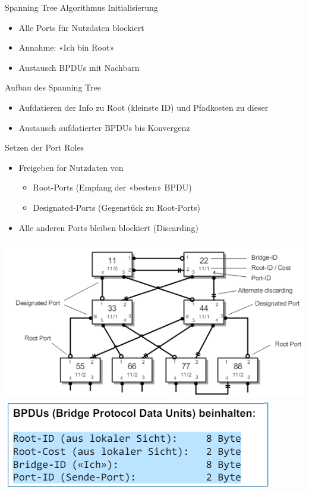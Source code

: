 \begin{KR}{Spanning Tree Algorithmus}
    Initialisierung
    \begin{itemize}
        \item Alle Ports für Nutzdaten blockiert
        \item Annahme: «Ich bin Root»
        \item Austausch BPDUs mit Nachbarn
    \end{itemize}
    Aufbau des Spanning Tree
    \begin{itemize}
        \item Aufdatieren der Info zu Root (kleinste ID) und Pfadkosten zu dieser
        \item Austausch aufdatierter BPDUs bis Konvergenz
    \end{itemize}
    Setzen der Port Roles
    \begin{itemize}
        \item Freigeben for Nutzdaten von
        \begin{itemize}
            \item Root-Ports (Empfang der «besten» BPDU)
            \item Designated-Ports (Gegenstück zu Root-Ports)
        \end{itemize}
        \item Alle anderen Ports bleiben blockiert (Discarding)
    \end{itemize}
        \includegraphics[width=0.75\linewidth]{images/spanning_tree_algorithmus.png}\\
        \includegraphics[width=0.5\linewidth]{images/bdpus.png}
\end{KR}

\columnbreak

